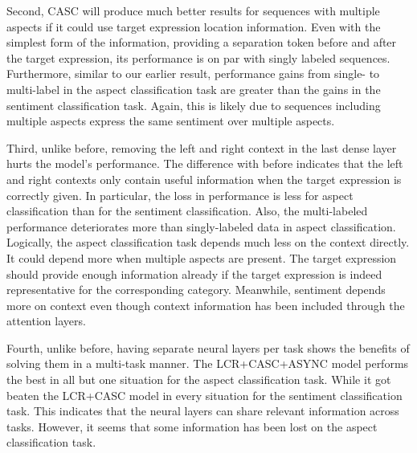 \documentclass[american, oneside]{ecsgdp}
\begin{document}
Second, CASC will produce much better results for sequences with multiple aspects if it could use target expression location information. Even with the simplest form of the information, providing a separation token before and after the target expression, its performance is on par with singly labeled sequences. Furthermore, similar to our earlier result, performance gains from single- to multi-label in the aspect classification task are greater than the gains in the sentiment classification task. Again, this is likely due to sequences including multiple aspects express the same sentiment over multiple aspects.


Third, unlike before, removing the left and right context in the last dense layer hurts the model's performance. The difference with before indicates that the left and right contexts only contain useful information when the target expression is correctly given. In particular, the loss in performance is less for aspect classification than for the sentiment classification. Also, the multi-labeled performance deteriorates more than singly-labeled data in aspect classification. Logically, the aspect classification task depends much less on the context directly. It could depend more when multiple aspects are present. The target expression should provide enough information already if the target expression is indeed representative for the corresponding category. Meanwhile, sentiment depends more on context even though context information has been included through the attention layers. 

Fourth, unlike before, having separate neural layers per task shows the benefits of solving them in a multi-task manner. The LCR+CASC+ASYNC model performs the best in all but one situation for the aspect classification task. While it got beaten the LCR+CASC model in every situation for the sentiment classification task. This indicates that the neural layers can share relevant information across tasks. However, it seems that some information has been lost on the aspect classification task.
\end{document}
